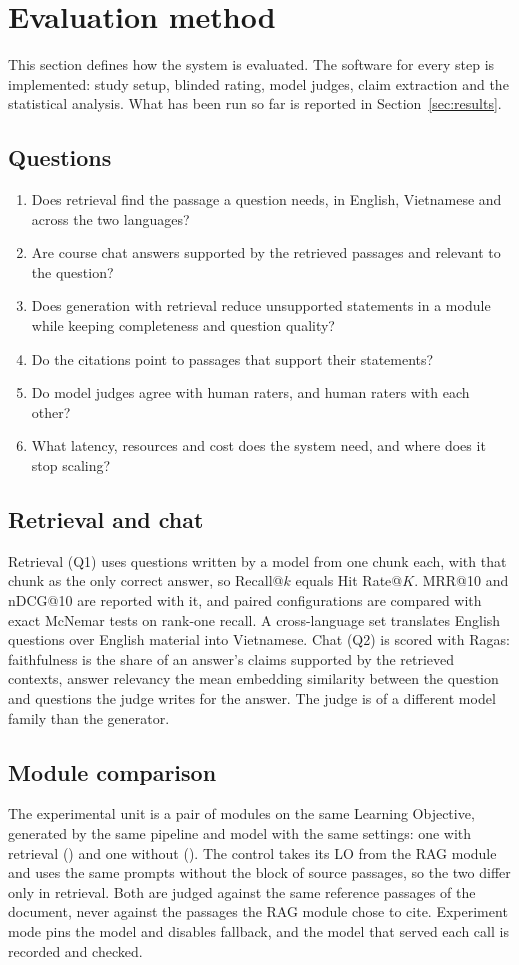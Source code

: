 \clearpage\section{Evaluation method}\label{sec:evaluation}
This section defines how the system is evaluated. The software for every step is implemented: study setup, blinded rating, model judges, claim extraction and the statistical analysis. What has been run so far is reported in Section~\ref{sec:results}.
\subsection{Questions}
\begin{enumerate}[label=Q\arabic*.,leftmargin=*,nosep]
\item Does retrieval find the passage a question needs, in English, Vietnamese and across the two languages?
\item Are course chat answers supported by the retrieved passages and relevant to the question?
\item Does generation with retrieval reduce unsupported statements in a module while keeping completeness and question quality?
\item Do the citations point to passages that support their statements?
\item Do model judges agree with human raters, and human raters with each other?
\item What latency, resources and cost does the system need, and where does it stop scaling?
\end{enumerate}
\subsection{Retrieval and chat}
Retrieval (Q1) uses questions written by a model from one chunk each, with that chunk as the only correct answer, so Recall@$k$ equals Hit Rate@$K$. MRR@10 and nDCG@10 are reported with it, and paired configurations are compared with exact McNemar tests on rank-one recall\citep{mcnemar}. A cross-language set translates English questions over English material into Vietnamese. Chat (Q2) is scored with Ragas\citep{ragas}: faithfulness is the share of an answer's claims supported by the retrieved contexts, answer relevancy the mean embedding similarity between the question and questions the judge writes for the answer. The judge is of a different model family than the generator\citep{selfpreference}.
\subsection{Module comparison}\label{sec:conditions}
The experimental unit is a pair of modules on the same Learning Objective, generated by the same pipeline and model with the same settings: one with retrieval () and one without (). The control takes its LO from the RAG module and uses the same prompts without the block of source passages, so the two differ only in retrieval. Both are judged against the same reference passages of the document, never against the passages the RAG module chose to cite. Experiment mode pins the model and disables fallback, and the model that served each call is recorded and checked.

